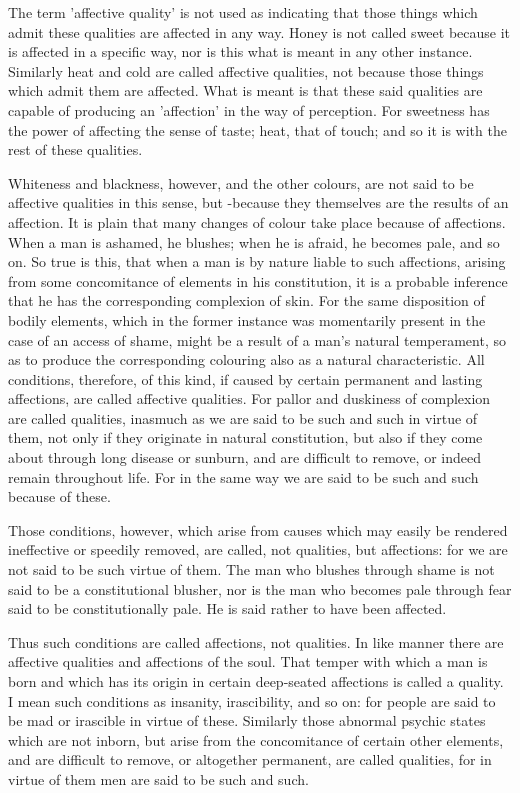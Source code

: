 The term 'affective quality' is not used as indicating that those
things which admit these qualities are affected in any way. Honey is
not called sweet because it is affected in a specific way, nor is this
what is meant in any other instance. Similarly heat and cold are called
affective qualities, not because those things which admit them are
affected. What is meant is that these said qualities are capable of
producing an 'affection' in the way of perception. For sweetness has
the power of affecting the sense of taste; heat, that of touch; and so
it is with the rest of these qualities.

Whiteness and blackness, however, and the other colours, are not said
to be affective qualities in this sense, but -because they themselves
are the results of an affection. It is plain that many changes of
colour take place because of affections. When a man is ashamed, he
blushes; when he is afraid, he becomes pale, and so on. So true is
this, that when a man is by nature liable to such affections, arising
from some concomitance of elements in his constitution, it is a
probable inference that he has the corresponding complexion of skin.
For the same disposition of bodily elements, which in the former
instance was momentarily present in the case of an access of shame,
might be a result of a man's natural temperament, so as to produce the
corresponding colouring also as a natural characteristic. All
conditions, therefore, of this kind, if caused by certain permanent and
lasting affections, are called affective qualities. For pallor and
duskiness of complexion are called qualities, inasmuch as we are said
to be such and such in virtue of them, not only if they originate in
natural constitution, but also if they come about through long disease
or sunburn, and are difficult to remove, or indeed remain throughout
life. For in the same way we are said to be such and such because of
these.

Those conditions, however, which arise from causes which may easily be
rendered ineffective or speedily removed, are called, not qualities,
but affections: for we are not said to be such virtue of them. The man
who blushes through shame is not said to be a constitutional blusher,
nor is the man who becomes pale through fear said to be
constitutionally pale. He is said rather to have been affected.

Thus such conditions are called affections, not qualities. In like
manner there are affective qualities and affections of the soul. That
temper with which a man is born and which has its origin in certain
deep-seated affections is called a quality. I mean such conditions as
insanity, irascibility, and so on: for people are said to be mad or
irascible in virtue of these. Similarly those abnormal psychic states
which are not inborn, but arise from the concomitance of certain other
elements, and are difficult to remove, or altogether permanent, are
called qualities, for in virtue of them men are said to be such and
such.

